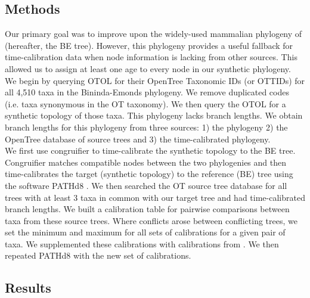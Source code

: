 \documentclass[a4paper,11pt]{article}
\begin{document}
\subsection*{Methods}
Our primary goal was to improve upon the widely-used mammalian phylogeny of \citet{BinindaEmonds2007} (hereafter, the BE tree). However, this phylogeny provides a useful fallback for time-calibration data when node information is lacking from other sources. This allowed us to assign at least one age to every node in our synthetic phylogeny. We begin by querying OTOL for their OpenTree Taxonomic IDs (or OTTIDs) for all 4,510 taxa in the Bininda-Emonds phylogeny. We remove duplicated codes (i.e. taxa synonymous in the OT taxonomy). We then query the OTOL for a synthetic topology of those taxa. This phylogeny lacks branch lengths. We obtain branch lengths for this phylogeny from three sources: 1) the \citet{BinindaEmonds2007} phylogeny 2) the OpenTree database of source trees and 3) the \citet{Meredith2009} time-calibrated phylogeny. \\
We first use congruifier \citep{Eastman2012, Pennell2014} to time-calibrate the synthetic topology to the BE tree. Congruifier matches compatible nodes between the two phylogenies and then time-calibrates the target (synthetic topology) to the reference (BE) tree using the software PATHd8 \citep{PATHd8}. We then searched the OT source tree database for all trees with at least 3 taxa in common with our target tree and had time-calibrated branch lengths. We built a calibration table for pairwise comparisons between taxa from these source trees. Where conflicts arose between conflicting trees, we set the minimum and maximum for all sets of calibrations for a given pair of taxa. We supplemented these calibrations with calibrations from \citet{Meredith2009}. We then repeated PATHd8 with the new set of calibrations.  
\subsection*{Results}
\end{document}
